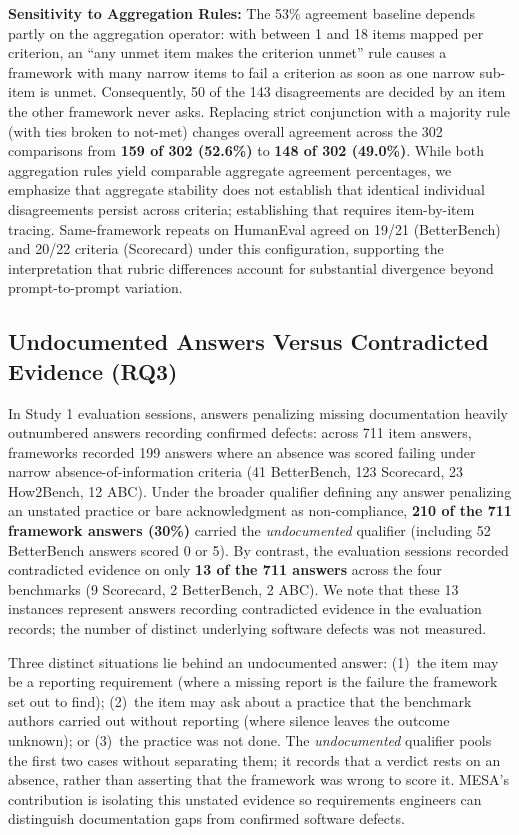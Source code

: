 \documentclass[runningheads]{llncs}
\begin{document}
\textbf{Sensitivity to Aggregation Rules:} The 53\% agreement baseline depends partly on the aggregation operator: with between 1 and 18 items mapped per criterion, an ``any unmet item makes the criterion unmet'' rule causes a framework with many narrow items to fail a criterion as soon as one narrow sub-item is unmet. Consequently, 50 of the 143 disagreements are decided by an item the other framework never asks. Replacing strict conjunction with a majority rule (with ties broken to not-met) changes overall agreement across the 302 comparisons from \textbf{159 of 302 (52.6\%)} to \textbf{148 of 302 (49.0\%)}. While both aggregation rules yield comparable aggregate agreement percentages, we emphasize that aggregate stability does not establish that identical individual disagreements persist across criteria; establishing that requires item-by-item tracing. Same-framework repeats on HumanEval agreed on 19/21 (BetterBench) and 20/22 criteria (Scorecard) under this configuration, supporting the interpretation that rubric differences account for substantial divergence beyond prompt-to-prompt variation.

\subsection{Undocumented Answers Versus Contradicted Evidence (RQ3)}
In Study 1 evaluation sessions, answers penalizing missing documentation heavily outnumbered answers recording confirmed defects: across 711 item answers, frameworks recorded 199 answers where an absence was scored failing under narrow absence-of-information criteria (41 BetterBench, 123 Scorecard, 23 How2Bench, 12 ABC). Under the broader qualifier defining any answer penalizing an unstated practice or bare acknowledgment as non-compliance, \textbf{210 of the 711 framework answers (30\%)} carried the \emph{undocumented} qualifier (including 52 BetterBench answers scored 0 or 5). By contrast, the evaluation sessions recorded contradicted evidence on only \textbf{13 of the 711 answers} across the four benchmarks (9 Scorecard, 2 BetterBench, 2 ABC). We note that these 13 instances represent answers recording contradicted evidence in the evaluation records; the number of distinct underlying software defects was not measured.

Three distinct situations lie behind an undocumented answer: (1)~the item may be a reporting requirement (where a missing report is the failure the framework set out to find); (2)~the item may ask about a practice that the benchmark authors carried out without reporting (where silence leaves the outcome unknown); or (3)~the practice was not done. The \emph{undocumented} qualifier pools the first two cases without separating them; it records that a verdict rests on an absence, rather than asserting that the framework was wrong to score it. MESA's contribution is isolating this unstated evidence so requirements engineers can distinguish documentation gaps from confirmed software defects.
\end{document}
